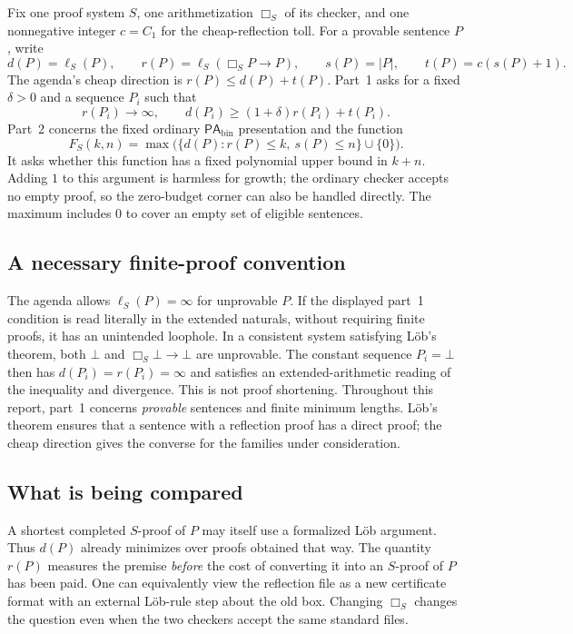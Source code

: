 \documentclass[11pt]{article}
\theoremstyle{definition}
\theoremstyle{remark}
\newcommand{\PAbin}{\mathsf{PA}_{\mathrm{bin}}}
\begin{document}
Fix one proof system $S$, one arithmetization $\Box_S$ of its checker, and
one nonnegative integer $c=C_1$ for the cheap-reflection toll. For a provable
sentence $P$, write
\begin{equation}\label{eq:notation}
 d(P)=\ell_S(P),\qquad r(P)=\ell_S(\Box_S P\to P),\qquad
 s(P)=|P|,\qquad t(P)=c(s(P)+1).
\end{equation}
The agenda's cheap direction is $r(P)\le d(P)+t(P)$.
Part~1 asks for a fixed $\delta>0$ and a sequence $P_i$ such that
\begin{equation}\label{eq:partone}
 r(P_i)\longrightarrow\infty,\qquad
 d(P_i)\ge(1+\delta)r(P_i)+t(P_i).
\end{equation}
Part~2 concerns the fixed ordinary $\PAbin$ presentation and the function
\begin{equation}\label{eq:F}
 F_S(k,n)=\max\bigl(\{d(P):r(P)\le k,\ s(P)\le n\}\cup\{0\}\bigr).
\end{equation}
It asks whether this function has a fixed polynomial upper bound in $k+n$.
Adding $1$ to this argument is harmless for growth; the ordinary checker
accepts no empty proof, so the zero-budget corner can also be handled directly.
The maximum includes $0$ to cover an empty set of eligible sentences.

\subsection{A necessary finite-proof convention}
The agenda allows $\ell_S(P)=\infty$ for unprovable $P$. If the displayed
part~1 condition is read literally in the extended naturals, without requiring
finite proofs, it has an unintended loophole. In a consistent system satisfying
L\"ob's theorem, both $\bot$ and $\Box_S\bot\to\bot$ are unprovable.
The constant sequence $P_i=\bot$ then has $d(P_i)=r(P_i)=\infty$ and
satisfies an extended-arithmetic reading of the inequality and divergence.
This is not proof shortening. Throughout this report, part~1 concerns
\emph{provable} sentences and finite minimum lengths. L\"ob's theorem ensures
that a sentence with a reflection proof has a direct proof; the cheap direction
gives the converse for the families under consideration.

\subsection{What is being compared}
A shortest completed $S$-proof of $P$ may itself use a formalized L\"ob argument.
Thus $d(P)$ already minimizes over proofs obtained that way. The quantity
$r(P)$ measures the premise \emph{before} the cost of converting it into an
$S$-proof of $P$ has been paid. One can equivalently view the reflection file
as a new certificate format with an external L\"ob-rule step about the old box.
Changing $\Box_S$ changes the question even when the two checkers accept the
same standard files.
\end{document}
